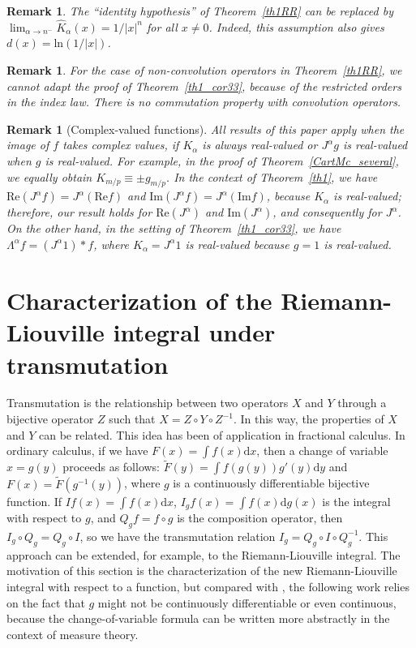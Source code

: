 \documentclass[12pt,reqno]{amsart}
\theoremstyle{plain}
\newtheorem{remark}[theorem]{Remark}
\numberwithin{equation}{section} %
\begin{document}
\begin{remark} \normalfont
The ``identity hypothesis'' of Theorem~\ref{th1RR} can be replaced by $\lim_{\alpha\rightarrow n^-}\widehat{K}_{\alpha}(x)=1/|x|^{n}$ for all $x\neq 0$. Indeed, this assumption also gives $d(x)=\mathrm{ln}(1/|x|)$.
\end{remark}


\begin{remark} \normalfont
For the case of non-convolution operators in Theorem~\ref{th1RR}, we cannot adapt the proof of Theorem~\ref{th1_cor33}, because of the restricted orders in the index law. There is no commutation property with convolution operators.
\end{remark}


\begin{remark}[Complex-valued functions] \normalfont
All results of this paper apply when the image of $f$ takes complex values, if $K_\alpha$ is always real-valued or $J^\alpha g$ is real-valued when $g$ is real-valued. For example, in the proof of Theorem~\ref{CartMc_several}, we equally obtain $K_{m/p}\equiv \pm g_{m/p}$. In the context of Theorem~\ref{th1}, we have $\mathrm{Re}(J^\alpha f)=J^\alpha (\mathrm{Re} f)$ and $\mathrm{Im}(J^\alpha f)=J^\alpha (\mathrm{Im} f)$, because $K_\alpha$ is real-valued; therefore, our result holds for $\mathrm{Re}(J^\alpha)$ and $\mathrm{Im}(J^\alpha)$, and consequently for $J^\alpha$. On the other hand, in the setting of Theorem~\ref{th1_cor33}, we have $\Lambda^\alpha f=(J^\alpha 1)\ast f$, where $K_\alpha=J^\alpha 1$ is real-valued because $g=1$ is real-valued.
\end{remark}


\section{Characterization of the Riemann-Liouville integral under transmutation}

Transmutation is the relationship between two operators $X$ and $Y$ through a bijective operator $Z$ such that $X=Z\circ Y\circ Z^{-1}$. In this way, the properties of $X$ and $Y$ can be related. This idea has been of application in fractional calculus. In ordinary calculus, if we have $F(x)=\int f(x)\mathrm{d}x$,
then a change of variable $x=g(y)$ proceeds as follows: $\tilde{F}(y)=\int f(g(y))g'(y)\mathrm{d}y$ and $F(x)=\tilde{F}(g^{-1}(y))$,
where $g$ is a continuously differentiable bijective function. If $If(x)=\int f(x)\mathrm{d}x$, $I_g f(x)=\int f(x)\mathrm{d}g(x)$ is the integral with respect to $g$, and $Q_g f=f\circ g$ is the composition operator, then $I_g\circ Q_g=Q_g\circ I$,
so we have the transmutation relation $I_g=Q_g\circ I\circ Q_g^{-1}$. This approach can be extended, for example, to the Riemann-Liouville integral. The motivation of this section is the characterization of the new Riemann-Liouville integral with respect to a function, but compared with \cite{cao_jie,meu}, the following work relies on the fact that $g$ might not be continuously differentiable or even continuous, because the change-of-variable formula can be written more abstractly in the context of measure theory.
\end{document}

